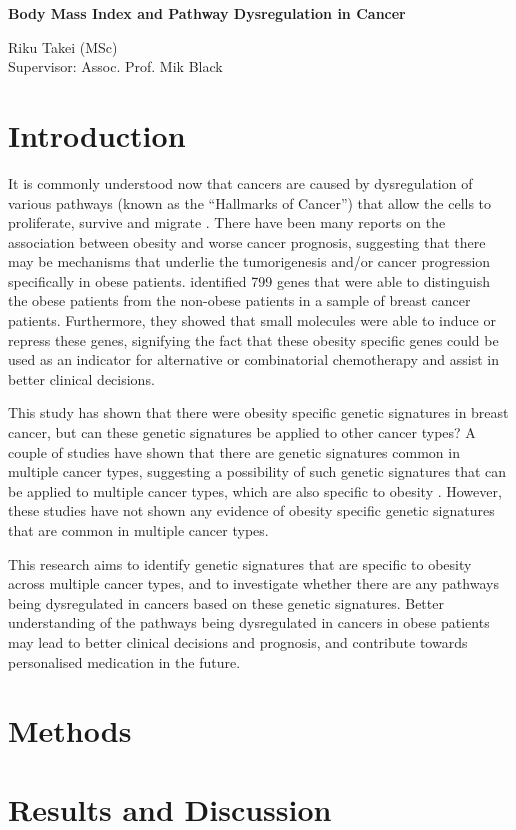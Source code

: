 \documentclass[a4paper,12pt]{report}
\begin{document}
\begin{center}
\large{\textbf{Body Mass Index and Pathway Dysregulation in Cancer}}\\

\vspace{0.3cm}

Riku Takei (MSc)\\
Supervisor: Assoc. Prof. Mik Black
\end{center}

\section*{Introduction}

It is commonly understood now that cancers are caused by dysregulation of various pathways (known as the ``Hallmarks of Cancer'') that allow the cells to proliferate, survive and migrate \citep{Hanahan2011}.
There have been many reports on the association between obesity and worse cancer prognosis, suggesting that there may be mechanisms that underlie the tumorigenesis and/or cancer progression specifically in obese patients.
\citet{Creighton2012} identified 799 genes that were able to distinguish the obese patients from the non-obese patients in a sample of breast cancer patients.
Furthermore, they showed that small molecules were able to induce or repress these genes, signifying the fact that these obesity specific genes could be used as an indicator for alternative or combinatorial chemotherapy and assist in better clinical decisions.

This study has shown that there were obesity specific genetic signatures in breast cancer, but can these genetic signatures be applied to other cancer types?
A couple of studies have shown that there are genetic signatures common in multiple cancer types, suggesting a possibility of such genetic signatures that can be applied to multiple cancer types, which are also specific to obesity \citep{Alexandrov2013,Lawrence2014}.
However, these studies have not shown any evidence of obesity specific genetic signatures that are common in multiple cancer types.

This research aims to identify genetic signatures that are specific to obesity across multiple cancer types, and to investigate whether there are any pathways being dysregulated in cancers based on these genetic signatures.
Better understanding of the pathways being dysregulated in cancers in obese patients may lead to better clinical decisions and prognosis, and contribute towards personalised medication in the future.

\section*{Methods}


\section*{Results and Discussion}


\printbibliography
\end{document}
